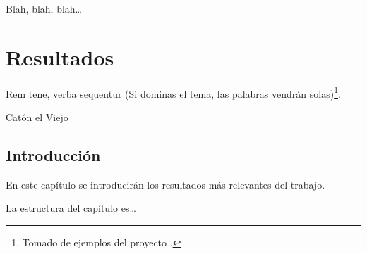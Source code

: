 Blah, blah, blah\ldots





%
%
%
% 
%
%
%
%

\chapter{Resultados}
\label{cha:resultados}


\begin{FraseCelebre}
  \begin{Frase}
    Rem tene, verba sequentur (Si dominas el tema, las palabras vendrán solas)\footnote{Tomado de ejemplos del proyecto \texis{}.}.
  \end{Frase}
  \begin{Fuente}
    Catón el Viejo
  \end{Fuente}
\end{FraseCelebre}

\section{Introducción}
\label{sec:introduccion-resultados}

En este capítulo se introducirán los resultados más relevantes del trabajo.

La estructura del capítulo es\ldots


